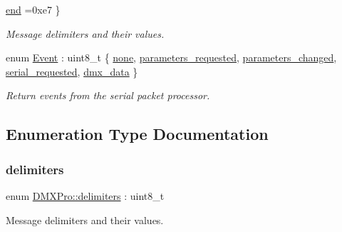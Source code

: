 \begin{DoxyCompactItemize}
\hyperlink{namespaceDMXPro_ae978412ae5d98682f1a8f876434749d6a0011ec6afa29407d423b9ad17a00c6dd}{end} =0xe7
 \}\begin{DoxyCompactList}\small\item\em Message delimiters and their values. \end{DoxyCompactList}
\item 
enum \hyperlink{namespaceDMXPro_a0b4335b3ed2abbd803e6d33c54d6ac6d}{Event} \+: uint8\+\_\+t \{ \newline
\hyperlink{namespaceDMXPro_a0b4335b3ed2abbd803e6d33c54d6ac6daa4efa255fbd673aa733c90fd0e2c2ca7}{none}, 
\hyperlink{namespaceDMXPro_a0b4335b3ed2abbd803e6d33c54d6ac6da94e16da01d36dcedc1f2fdacdeba2399}{parameters\+\_\+requested}, 
\hyperlink{namespaceDMXPro_a0b4335b3ed2abbd803e6d33c54d6ac6da013201c7d4dde91ca5c8ce7a2b60e71d}{parameters\+\_\+changed}, 
\hyperlink{namespaceDMXPro_a0b4335b3ed2abbd803e6d33c54d6ac6da2135a293c38559b59c95f8e31c96b2b1}{serial\+\_\+requested}, 
\newline
\hyperlink{namespaceDMXPro_a0b4335b3ed2abbd803e6d33c54d6ac6dad38fe8af23604d427d36da681d413dda}{dmx\+\_\+data}
 \}\begin{DoxyCompactList}\small\item\em Return events from the serial packet processor. \end{DoxyCompactList}
\end{DoxyCompactItemize}


\subsection{Enumeration Type Documentation}
\mbox{\label{namespaceDMXPro_ae978412ae5d98682f1a8f876434749d6}} 
\subsubsection{\texorpdfstring{delimiters}{delimiters}}
{\footnotesize\ttfamily enum \hyperlink{namespaceDMXPro_ae978412ae5d98682f1a8f876434749d6}{D\+M\+X\+Pro\+::delimiters} \+: uint8\+\_\+t}



Message delimiters and their values. 

